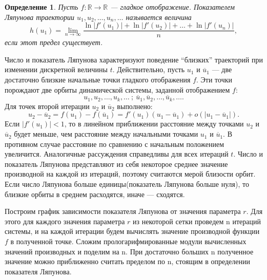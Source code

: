 \documentclass[10pt]{article}
\newtheorem{definition}{Определение}
\numberwithin{equation}{section}
\begin{document}
\begin{definition}
	Пусть \( f : \mathbb{R} \to \mathbb{R} \) --- гладкое отображение. Показателем Ляпунова траектории \( u_1, u_2, \dots, u_n, \dots \) называется величина
	\[ h(u_1) = \lim\limits_{n \to \infty} \frac{\ln|f'(u_1)| + \ln|f'(u_2)| + \dots + \ln|f'(u_n)|}{n}, \]
	если этот предел существует.
\end{definition}

Число и показатель Ляпунова характеризуют поведение ``близких'' траекторий при изменении дискретной величины \( t \). Действительно, пусть \( u_1 \) и \( \overline{u}_1 \) --- две достаточно близкие начальные точки гладкого отображения \( f \). Эти точки порождают две орбиты динамической системы, заданной отображением \( f \):
\[ u_1, u_2, \dots, u_k, \dots \ ; \ \overline{u}_1, \overline{u}_2, \dots, \overline{u}_k, \dots .\]
Для точек второй итерации \( u_2 \) и \( \overline{u}_2 \) выполнено:
\[ u_2 - \overline{u}_2 = f(u_1) - f(\overline{u}_1) = f'(u_1)(u_1 - \overline{u}_1) + o(|u_1 - \overline{u}_1|) .\]
Если \( |f'(u_1)| < 1 \), то в линейном приближении расстояние между точками \( u_2 \) и \( \overline{u}_2 \) будет меньше, чем расстояние между начальными точками \( u_1\) и \( \overline{u}_1 \). В противном случае расстояние по сравнению с начальным положением увеличится. Аналогичные рассуждения справедливы для всех итераций \( t \). Число и показатель Ляпунова представляют из себя некоторое среднее значение производной на каждой из итераций, поэтому считаются мерой близости орбит. Если число Ляпунова больше единицы(показатель Ляпунова больше нуля), то близкие орбиты в среднем расходятся, иначе --- сходятся. 

Построим график зависимости показателя Ляпунова от значения параметра \( r \). Для этого для каждого значения параметра \( r \) из некоторой сетки проведем n итераций системы, и на каждой итерации будем вычислять значение производной функции \( f \) в полученной точке. Сложим прологарифмированные модули вычисленных значений производных и поделим на n. При достаточно больших n полученное значение можно приближенно считать пределом по n, стоящим в определении показателя Ляпунова.
\end{document}
